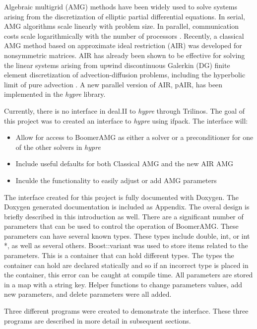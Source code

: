 \documentclass[11pt]{article}
\begin{document}
Algebraic multigrid (AMG) methods have been widely used to solve systems arising from the discretization of elliptic partial differential equations. In serial, AMG algorithms scale linearly with problem size. In parallel, communication costs scale logarithmically with the number of processors \cite{falgout1}. Recently, a classical AMG method based on approximate ideal restriction (AIR) was developed for nonsymmetric matrices. AIR has already been shown to be effective for solving the linear systems arising from upwind discontinuous Galerkin (DG) finite element discretization of advection-diffusion problems, including the hyperbolic limit of pure advection \cite{AIR1}\cite{AIR2}. A new parallel version of AIR, pAIR, has been implemented in the \textit{hypre} library.

Currently, there is no interface in deal.II to \textit{hypre} through Trilinos. The goal of this project was to created an interface to \textit{hypre} using ifpack. The interface will:
\begin{itemize}
	\item Allow for access to BoomerAMG as either a solver or a preconditioner for one of the other solvers in \textit{hypre}
	\item Include useful defaults for both Classical AMG and the new AIR AMG
	\item Inculde the functionality to easily adjust or add AMG parameters
\end{itemize}

The interface created for this project is fully documented with Doxygen. The Doxygen generated documentation is included as Appendix. The overal design is briefly described in this introduction as well. There are a significant number of parameters that can be used to control the operation of BoomerAMG. These parameters can have several known types. These types include double, int, or int *, as well as several others. Boost::variant was used to store items related to the parameters. This is a container that can hold different types. The types the container can hold are declared statically and so if an incorrect type is placed in the container, this error can be caught at compile time. All parameters are stored in a map with a string key. Helper functions to change parameters values, add new parameters, and delete parameters were all added. 

Three different programs were created to demonstrate the interface. These three programs are described in more detail in subsequent sections. 
\end{document}
